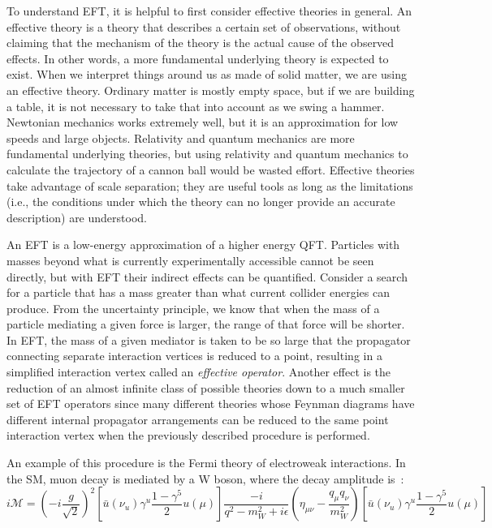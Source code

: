 To understand EFT, it is helpful to first consider effective theories in
general. An effective theory is a theory that describes a certain set of
observations, without claiming that the mechanism of the theory is the actual
cause of the observed effects. In other words, a more fundamental underlying
theory is expected to exist. When we interpret things around us as made of solid
matter, we are using an effective theory. Ordinary matter is mostly empty space,
but if we are building a table, it is not necessary to take that into account as
we swing a hammer. Newtonian mechanics works extremely well, but it is an
approximation for low speeds and large objects. Relativity and quantum mechanics
are more fundamental underlying theories, but using relativity and quantum
mechanics to calculate the trajectory of a cannon ball would be wasted effort.
Effective theories take advantage of scale separation; they are useful tools as
long as the limitations (i.e., the conditions under which the theory can no
longer provide an accurate description) are understood.

An EFT is a low-energy approximation of a higher energy QFT. Particles with
masses beyond what is currently experimentally accessible cannot be seen
directly, but with EFT their indirect effects can be quantified. Consider a
search for a particle that has a mass greater than what current collider
energies can produce. From the uncertainty principle, we know that when the mass
of a particle mediating a given force is larger, the range of that force will be
shorter. In EFT, the mass of a given mediator is taken to be so large that the
propagator connecting separate interaction vertices is reduced to a point,
resulting in a simplified interaction vertex called an \emph{effective
operator}. Another effect is the reduction of an almost infinite class of
possible theories down to a much smaller set of EFT operators since many
different theories whose Feynman diagrams have different internal propagator
arrangements can be reduced to the same point interaction vertex when the
previously described procedure is performed.

An example of this procedure is the Fermi theory of electroweak interactions. In
the SM, muon decay is mediated by a W boson, where the decay amplitude
is~\cite{Maggiore:845116}:
\begin{equation}
  i\mathcal{M} = (-i\frac{g}{\sqrt{2}})^2
  \left[
    \bar{u}(\nu_u)\gamma^u\frac{1 - \gamma^5}{2} u(\mu)
  \right]
  \frac{-i}{q^2 - m_W^2 + i\epsilon}
  \left(
  \eta_{\mu\nu} - \frac{q_\mu q_\nu}{m_W^2}\right)
  \left[
    \bar{u}(\nu_u)\gamma^u\frac{1 - \gamma^5}{2} u(\mu)
  \right]
\end{equation}


